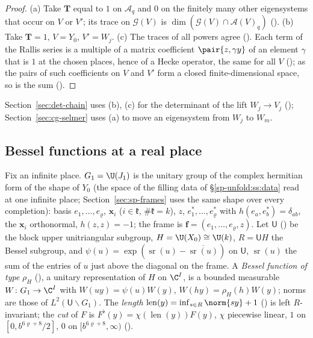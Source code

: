 \begin{proof}
(a) Take $\mathbf T$ equal to $1$ on $\mathcal A_q$ and $0$ on the finitely many other eigensystems that
occur on $V$ or $V'$; its trace on $\mathcal G(V)$ is $\dim(\mathcal G(V)\cap\mathcal A(V)_q)$
(). (b) Take $\mathbf T=1$, $V=Y_0$, $V'=W_j$. (c) The traces of
all powers agree (). Each term of the Rallis series is a
multiple of a matrix coefficient $\pair{z,\gamma y}$ of an element $\gamma$ that is $1$ at the
chosen places, hence of a Hecke operator, the same for all $V$
(); as the pairs of such coefficients on $V$ and $V'$
form a closed finite-dimensional space, so is the sum
().
\end{proof}

Section~\ref{sec:det-chain} uses (b), (c) for the determinant of the lift $W_j\to V_j$
(); Section~\ref{sec:cg-selmer} uses (a) to move an
eigensystem from $W_j$ to $W_m$.

\subsection{Bessel functions at a real place}\label{sp-moment:ss:bessel}

Fix an infinite place. $G_1=\U(J_1)$ is the unitary group of the complex hermitian form of the
shape of $Y_0$ (the space of the filling data of \S\ref{sp-unfold:ss:data} read at one infinite
place; Section~\ref{sec:sp-frames} uses the same shape over every completion): basis $e_1,\dots,e_\varrho$, $\mathbf x_i$ ($i\in\mathfrak k$, $\#\mathfrak k=k$), $z$,
$e_1^*,\dots,e_\varrho^*$ with $h(e_a,e_b^*)=\delta_{ab}$, the $\mathbf x_i$ orthonormal, $h(z,z)=-1$; the
frame is $\mathbf f=(e_1,\dots,e_\varrho,z)$. Let $\mathsf U$ () be the
block upper unitriangular subgroup, $H=\U(X_0)\cong\U(k)$, $R=\mathsf UH$ the Bessel
subgroup, and $\psi(u)=\exp(\operatorname{sr}(u)-\overline{\operatorname{sr}(u)})$ on $\mathsf U$, $\operatorname{sr}(u)$ the
sum of the entries of $u$ just above the diagonal on the frame. A \emph{Bessel function of type} $\rho_H$
(), a unitary representation of $H$ on $\C^I$, is a bounded measurable
$W\colon G_1\to\C^I$ with $W(uy)=\psi(u)W(y)$, $W(hy)=\rho_H(h)W(y)$; norms are those of
$L^2(\mathsf U\backslash G_1)$. The \emph{length} $\operatorname{len}(y)=\inf_{s\in R}\norm{sy}+1$
() is left $R$-invariant; the \emph{cut} of $F$ is
$F^\flat(y)=\chi(\operatorname{len}(y))F(y)$, $\chi$ piecewise linear, $1$ on $[0,b^{6\varrho+8}/2]$, $0$ on
$[b^{6\varrho+8},\infty)$ ().

